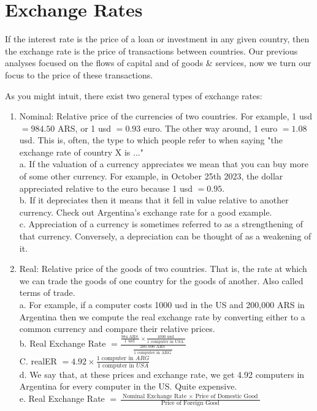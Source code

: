 \documentclass[10pt]{article}
\begin{document}
\section*{Exchange Rates}
If the interest rate is the price of a loan or investment in any given country, then the exchange rate is the price of transactions between countries. Our previous analyses focused on the flows of capital and of goods \& services, now we turn our focus to the price of these transactions.

As you might intuit, there exist two general types of exchange rates:

\begin{enumerate}
  \item Nominal: Relative price of the currencies of two countries. For example, 1 usd $=984.50$ ARS, or 1 usd $=0.93$ euro. The other way around, 1 euro $=1.08$ usd. This is, often, the type to which people refer to when saying "the exchange rate of country X is ..."\\
a. If the valuation of a currency appreciates we mean that you can buy more of some other currency. For example, in October 25th 2023, the dollar appreciated relative to the euro because 1 usd $=0.95$.\\
b. If it depreciates then it means that it fell in value relative to another currency. Check out Argentina's exchange rate for a good example.\\
c. Appreciation of a currency is sometimes referred to as a strengthening of that currency. Conversely, a depreciation can be thought of as a weakening of it.
  \item Real: Relative price of the goods of two countries. That is, the rate at which we can trade the goods of one country for the goods of another. Also called terms of trade.\\
a. For example, if a computer costs 1000 usd in the US and 200,000 ARS in Argentina then we compute the real exchange rate by converting either to a common currency and compare their relative prices.\\
b. Real Exchange Rate $=\frac{\frac{984 \text { ARS }}{1 \text { usd }} \times \frac{1000 \text { usd }}{1 \text { computer in USA }}}{\frac{200,000 \text { ARS }}{1 \text { computer in ARG }}}$\\
C. realER $=4.92 \times \frac{1 \text { computer in } A R G}{1 \text { computer in } U S A}$\\
d. We say that, at these prices and exchange rate, we get 4.92 computers in Argentina for every computer in the US. Quite expensive.\\
e. Real Exchange Rate $=\frac{\text { Nominal Exchange Rate } \times \text { Price of Domestic Good }}{\text { Price of Foreign Good }}$
\end{enumerate}
\end{document}
